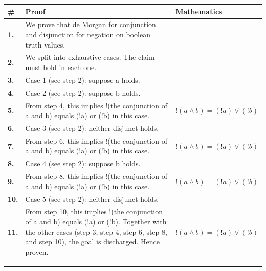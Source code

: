 \documentclass[11pt]{article}
\theoremstyle{definition}
\begin{document}
\begin{tabular}{@{} >{\raggedright\arraybackslash}p{} >{\raggedright\arraybackslash}p{} >{\raggedleft\arraybackslash}p{} @{}}
\textbf{\#} & \textbf{Proof} & \textbf{Mathematics} \\
\midrule
\textbf{1.} & We prove that de Morgan for conjunction and disjunction for negation on boolean truth values. & \\[0.45em]
\textbf{2.} & We split into exhaustive cases. The claim must hold in each one. & \\[0.45em]
\textbf{3.} & Case 1 (see step 2): suppose a holds. & \\[0.45em]
\textbf{4.} & Case 2 (see step 2): suppose b holds. & \\[0.45em]
\textbf{5.} & From step 4, this implies !(the conjunction of a and b) equals (!a) or (!b) in this case. & $\displaystyle !(a \land b) = (!a) \lor (!b)$ \\[0.45em]
\textbf{6.} & Case 3 (see step 2): neither disjunct holds. & \\[0.45em]
\textbf{7.} & From step 6, this implies !(the conjunction of a and b) equals (!a) or (!b) in this case. & $\displaystyle !(a \land b) = (!a) \lor (!b)$ \\[0.45em]
\textbf{8.} & Case 4 (see step 2): suppose b holds. & \\[0.45em]
\textbf{9.} & From step 8, this implies !(the conjunction of a and b) equals (!a) or (!b) in this case. & $\displaystyle !(a \land b) = (!a) \lor (!b)$ \\[0.45em]
\textbf{10.} & Case 5 (see step 2): neither disjunct holds. & \\[0.45em]
\textbf{11.} & From step 10, this implies !(the conjunction of a and b) equals (!a) or (!b). Together with the other cases (step 3, step 4, step 6, step 8, and step 10), the goal is discharged. Hence proven. & $\displaystyle !(a \land b) = (!a) \lor (!b)$ \\[0.45em]
\bottomrule
\end{tabular}
\label{thm:Bool-negation-de_morgan_for_conjunction_and_disjunction}
\par\medskip\hrule
\end{document}
